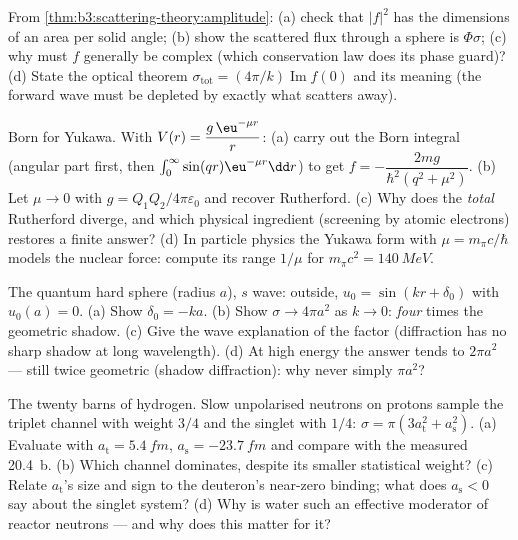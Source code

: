 \begin{exercise}[$\star$]\label{exo:b3:scattering-theory:4}
From \cref{thm:b3:scattering-theory:amplitude}: (a) check that
$|f|^2$ has the dimensions of an area per solid angle; (b) show
the scattered flux through a sphere is $\Phi\sigma$; (c) why must
$f$ generally be complex (which conservation law does its phase
guard)? (d) State the optical theorem $\sigma_{\text{tot}} =
(4\pi/k)\operatorname{Im}f(0)$ and its meaning (the forward wave
must be depleted by exactly what scatters away).
\end{exercise}

\begin{exercise}[$\star\star$]\label{exo:b3:scattering-theory:5}
Born for Yukawa. With $V(r) = \dfrac{g\,\eu^{-\mu r}}{r}$: (a)
carry out the Born integral (angular part first, then $\int_0^
\infty\sin(qr)\eu^{-\mu r}\dd r$) to get $f = -\dfrac{2mg}
{\hbar^2(q^2 + \mu^2)}$. (b) Let $\mu \to 0$ with $g =
Q_1Q_2/4\pi\varepsilon_0$ and recover Rutherford. (c) Why does the
\emph{total} Rutherford  diverge, and which physical
ingredient (screening by atomic electrons) restores a finite
answer? (d) In particle physics the Yukawa form with $\mu =
m_\pi c/\hbar$ models the nuclear force: compute its range
$1/\mu$ for $m_\pi c^2 = \qty{140}{MeV}$.
\end{exercise}

\begin{exercise}[$\star\star$]\label{exo:b3:scattering-theory:6}
The quantum hard sphere (radius $a$), $s$ wave: outside, $u_0 =
\sin(kr + \delta_0)$ with $u_0(a) = 0$. (a) Show $\delta_0 = -ka$.
(b) Show $\sigma \to 4\pi a^2$ as $k \to 0$: \emph{four} times the
geometric shadow. (c) Give the wave explanation of the factor
(diffraction has no sharp shadow at long wavelength). (d) At high
energy the answer tends to $2\pi a^2$ --- still twice geometric
(shadow diffraction): why never simply $\pi a^2$?
\end{exercise}

\begin{exercise}[$\star\star$]\label{exo:b3:scattering-theory:7}
The twenty barns of hydrogen. Slow unpolarised neutrons on
protons sample the triplet channel with weight $3/4$ and the
singlet with $1/4$: $\sigma = \pi(3a_{\text{t}}^2 +
a_{\text{s}}^2)$. (a) Evaluate with $a_{\text{t}} = \qty{5.4}{fm}$,
$a_{\text{s}} = \qty{-23.7}{fm}$ and compare with the measured
\qty{20.4}{b}. (b) Which channel dominates, despite its smaller
statistical weight? (c) Relate $a_{\text{t}}$'s size and sign to
the deuteron's near-zero binding; what does $a_{\text{s}} < 0$
say about the singlet system? (d) Why is water such an effective
moderator of reactor neutrons --- and why does this 
matter for it?
\end{exercise}

